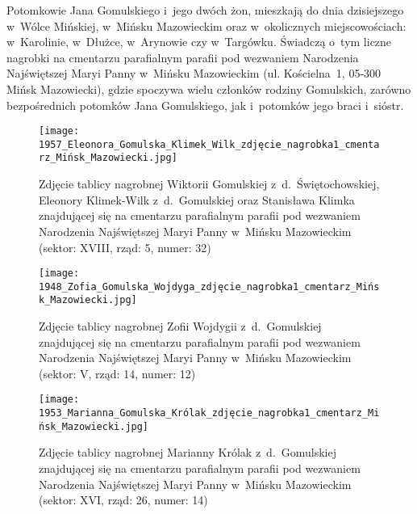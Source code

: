 Potomkowie Jana Gomulskiego i~jego dwóch żon, mieszkają do dnia dzisiejszego
w~Wólce Mińskiej, w~Mińsku Mazowieckim oraz w~okolicznych miejscowościach:
w~Karolinie, w~Dłużce, w~Arynowie czy w~Targówku. Świadczą o~tym liczne
nagrobki na cmentarzu parafialnym parafii pod wezwaniem Narodzenia
Najświętszej Maryi Panny w~Mińsku Mazowieckim (ul. Kościelna~1, 05-300 Mińsk
Mazowiecki), gdzie spoczywa wielu członków rodziny Gomulskich, zarówno
bezpośrednich potomków Jana Gomulskiego, jak i~potomków jego braci i~sióstr.

\begin{figure}[!ht]
    \vspace*{0.4cm}
    \centering \texttt{[image: 
        1957\_Eleonora\_Gomulska\_Klimek\_Wilk\_zdjęcie\_nagrobka1\_cmentarz\_Mińsk\_Mazowiecki.jpg]}
    \captionsetup{format=hang}
    \caption{Zdjęcie tablicy nagrobnej Wiktorii Gomulskiej 
    z~d.~Świętochowskiej, Eleonory Klimek-Wilk z~d.~Gomulskiej oraz Stanisława
    Klimka znajdującej się na cmentarzu parafialnym parafii pod wezwaniem
    Narodzenia Najświętszej Maryi Panny w~Mińsku Mazowieckim (sektor: XVIII,
    rząd: 5, numer: 32)}
    \label{fig:wgomulska_1957}
\end{figure}

\begin{figure}[!ht]
    \vspace*{0.4cm}
    \centering \texttt{[image: 
        1948\_Zofia\_Gomulska\_Wojdyga\_zdjęcie\_nagrobka1\_cmentarz\_Mińsk\_Mazowiecki.jpg]}
    \captionsetup{format=hang}
    \caption{Zdjęcie tablicy nagrobnej Zofii Wojdygii z~d.~Gomulskiej
    znajdującej się na cmentarzu parafialnym parafii pod wezwaniem Narodzenia
    Najświętszej Maryi Panny w~Mińsku Mazowieckim (sektor: V, rząd: 14,
    numer: 12)}
    \label{fig:zgomulska_1948}
\end{figure}

\begin{figure}[!ht]
    \vspace*{0.4cm}
    \centering \texttt{[image: 
        1953\_Marianna\_Gomulska\_Królak\_zdjęcie\_nagrobka1\_cmentarz\_Mińsk\_Mazowiecki.jpg]}
    \captionsetup{format=hang}
    \caption{Zdjęcie tablicy nagrobnej Marianny Królak z~d.~Gomulskiej
    znajdującej się na cmentarzu parafialnym parafii pod wezwaniem Narodzenia
    Najświętszej Maryi Panny w~Mińsku Mazowieckim (sektor: XVI, rząd: 26,
    numer: 14)}
    \label{fig:mgomulska_1953}
\end{figure}

